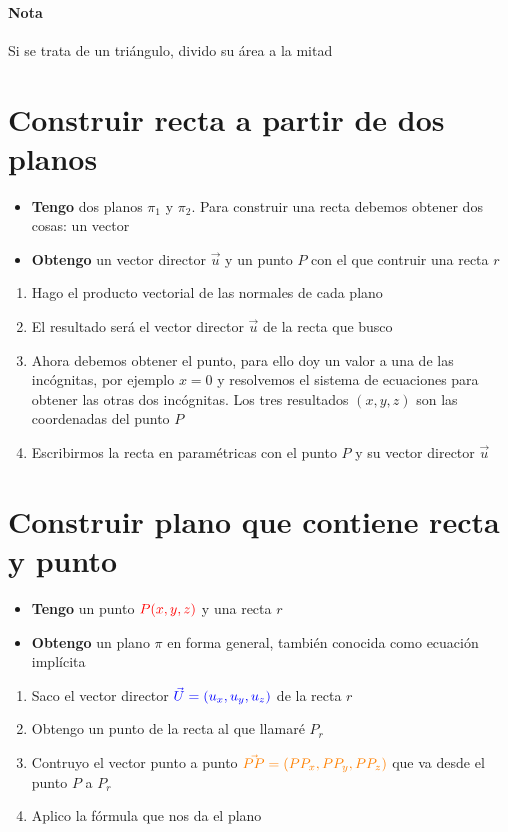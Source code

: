 \paragraph{Nota} Si se trata de un triángulo, divido su área a la mitad

\section{Construir recta a partir de dos planos}
\begin{itemize}
	\item \textbf{Tengo} dos planos $\pi_1$ y $\pi_2$. Para construir una recta debemos obtener dos cosas: un vector
	\item \textbf{Obtengo} un vector director $\vec{u}$ y un punto $P$ con el que contruir una recta $r$
\end{itemize}

\begin{enumerate}
	\item Hago el producto vectorial de las normales de cada plano
	\item El resultado será el vector director $\vec{u}$ de la recta que busco
	\item Ahora debemos obtener el punto, para ello doy un valor a una de las incógnitas, por
		ejemplo $x=0$ y resolvemos el sistema de ecuaciones para obtener las otras dos incógnitas.
		Los tres resultados $(x,y,z)$ son las coordenadas del punto $P$
	\item Escribirmos la recta en paramétricas con el punto $P$ y su vector director $\vec{u}$
\end{enumerate}


\section{Construir plano que contiene recta y punto}
\begin{itemize}
	\item \textbf{Tengo} un punto $\color{red}P(x,y,z)$ y una recta $r$
	\item \textbf{Obtengo} un plano $\pi$ en forma general, también conocida como ecuación implícita
\end{itemize}

\begin{enumerate}
	\item Saco el vector director $\color{blue}\vec{U}=(u_x,u_y,u_z)$ de la recta $r$
	\item Obtengo un punto de la recta al que llamaré $P_r$
	\item Contruyo el vector punto a punto $\color{orange}\vec{PP}=(PP_x,PP_y,PP_z)$ que va desde el punto $P$ a $P_r$
	\item Aplico la fórmula que nos da el plano
\end{enumerate}

